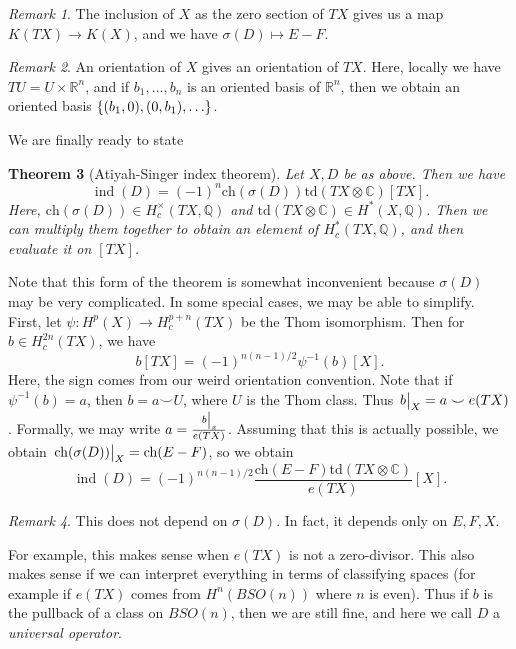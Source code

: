 \documentclass[leqno, openany]{memoir}
\newtheorem{thm}{Theorem}[section]
\theoremstyle{definition}
\theoremstyle{remark}
\newtheorem{rmk}[thm]{Remark}
\theoremstyle{plain}
\theoremstyle{definition}
\theoremstyle{remark}
\newcommand{\R}{\mathbb{R}}
\newcommand{\C}{\mathbb{C}}
\newcommand{\Q}{\mathbb{Q}}
\newcommand{\mr}[1]{\mathrm{#1}}
\DeclareMathOperator{\ch}{ch}
\DeclareMathOperator{\ind}{ind}
\begin{document}
\begin{rmk}
    The inclusion of $X$ as the zero section of $TX$ gives us a map $K(TX) \to K(X)$, and we have $\sigma(D) \mapsto E-F$.
\end{rmk}

\begin{rmk}
    An orientation of $X$ gives an orientation of $TX$. Here, locally we have $TU = U \times \R^n$, and if $b_1, \ldots, b_n$ is an oriented basis of $\R^n$, then we obtain an oriented basis $\qty{(b_1, 0), (0, b_1), \ldots}$.
\end{rmk}

We are finally ready to state

\begin{thm}[Atiyah-Singer index theorem]
    Let $X, D$ be as above. Then we have
    \[ \ind(D) = {(-1)}^n \mr{ch}(\sigma(D)) \mr{td}(TX \otimes \C) [TX]. \]
    Here, $\mr{ch}(\sigma(D)) \in H_c^{\times}(TX, \Q)$ and $\mr{td}(TX \otimes \C) \in H^*(X, \Q)$. Then we can multiply them together to obtain an element of $H_c^*(TX, \Q)$, and then evaluate it on $[TX]$.
\end{thm}

Note that this form of the theorem is somewhat inconvenient because $\sigma(D)$ may be very complicated. In some special cases, we may be able to simplify. First, let $\psi \colon H^p(X) \to H_c^{p+n}(TX)$ be the Thom isomorphism. Then for $b \in H_c^{2n}(TX)$, we have
\[ b[TX] = {(-1)}^{n(n-1)/2} \psi^{-1}(b) [X]. \]
Here, the sign comes from our weird orientation convention. Note that if $\psi^{-1}(b) = a$, then $b = a \smile U$, where $U$ is the Thom class. Thus $\eval{b}_X = a \smile e(TX)$. Formally, we may write $a = \frac{\eval{b}_x}{e(TX)}$. Assuming that this is actually possible, we obtain $\eval{ \ch(\sigma(D)) }_X = \ch(E-F)$, so we obtain
\[ \ind(D) = {(-1)}^{n(n-1)/2} \frac{\mr{ch}(E-F) \mr{td}(TX \otimes \C)}{e(TX)} [X]. \]
\begin{rmk}
    This does not depend on $\sigma(D)$. In fact, it depends only on $E, F, X$.
\end{rmk}
For example, this makes sense when $e(TX)$ is not a zero-divisor. This also makes sense if we can interpret everything in terms of classifying spaces (for example if $e(TX)$ comes from $H^n(BSO(n))$ where $n$ is even). Thus if $b$ is the pullback of a class on $BSO(n)$, then we are still fine, and here we call $D$ a \textit{universal operator}.
\end{document}
